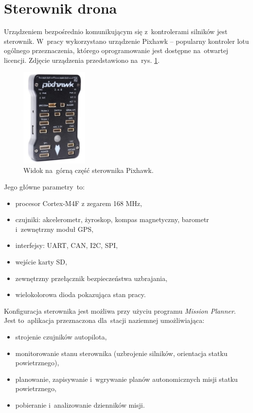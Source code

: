 \section{Sterownik drona}
\label{sec:autopilot}
Urządzeniem bezpośrednio komunikującym się z~kontrolerami silników jest sterownik. 
W~pracy wykorzystano urządzenie Pixhawk -- popularny kontroler lotu ogólnego przeznaczenia, którego oprogramowanie jest dostępne na~otwartej licencji. 
Zdjęcie urządzenia przedstawiono na~rys. \ref{fig:zdjecie_pixhawk}.
\begin{figure}[h]
	\centering
	\includegraphics[width=0.3\textwidth]{zdjecie_pixhawk.jpg}
	\caption{Widok na~górną część sterownika Pixhawk.}
	\label{fig:zdjecie_pixhawk}
\end{figure}
Jego główne parametry~to:
\begin{itemize}
	\item procesor Cortex-M4F z zegarem 168 MHz,
	\item czujniki: akcelerometr, żyroskop, kompas magnetyczny, barometr i~zewnętrzny moduł GPS,
	\item interfejsy: UART, CAN, I2C, SPI,
	\item wejście karty SD,
	\item zewnętrzny przełącznik bezpieczeństwa uzbrajania,
	\item wielokolorowa dioda pokazująca stan pracy.
\end{itemize}
Konfiguracja sterownika jest możliwa przy użyciu programu \textit{Mission Planner}. 
Jest to~aplikacja przeznaczona dla~stacji naziemnej umożliwiająca:
\begin{itemize}
	\item strojenie czujników autopilota,
	\item monitorowanie stanu sterownika (uzbrojenie silników, orientacja statku powietrznego),
	\item planowanie, zapisywanie i~wgrywanie planów autonomicznych misji statku powietrznego,
	\item pobieranie i~analizowanie dzienników misji.
\end{itemize} 

